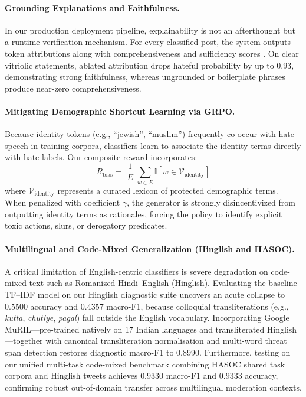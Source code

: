 \documentclass[11pt]{article}
\begin{document}
\paragraph{Grounding Explanations and Faithfulness.} 
In our production deployment pipeline, explainability is not an afterthought but a runtime verification mechanism. For every classified post, the system outputs token attributions along with comprehensiveness and sufficiency scores \citep{deyoung2020eraser}. On clear vitriolic statements, ablated attribution drops hateful probability by up to $0.93$, demonstrating strong faithfulness, whereas ungrounded or boilerplate phrases produce near-zero comprehensiveness.

\paragraph{Mitigating Demographic Shortcut Learning via GRPO.}
Because identity tokens (e.g., ``jewish'', ``muslim'') frequently co-occur with hate speech in training corpora, classifiers learn to associate the identity terms directly with hate labels. Our composite reward incorporates:
\begin{equation}
R_{\text{bias}} = \frac{1}{|E|} \sum_{w \in E} \mathbb{I}[w \in \mathcal{V}_{\text{identity}}]
\end{equation}
where $\mathcal{V}_{\text{identity}}$ represents a curated lexicon of protected demographic terms. When penalized with coefficient $\gamma$, the generator is strongly disincentivized from outputting identity terms as rationales, forcing the policy to identify explicit toxic actions, slurs, or derogatory predicates.

\paragraph{Multilingual and Code-Mixed Generalization (Hinglish and HASOC).}
A critical limitation of English-centric classifiers is severe degradation on code-mixed text such as Romanized Hindi--English (Hinglish). Evaluating the baseline TF--IDF model on our Hinglish diagnostic suite uncovers an acute collapse to $0.5500$ accuracy and $0.4357$ macro-F1, because colloquial transliterations (e.g., \emph{kutta}, \emph{chutiye}, \emph{pagal}) fall outside the English vocabulary. Incorporating Google MuRIL---pre-trained natively on 17 Indian languages and transliterated Hinglish---together with canonical transliteration normalisation and multi-word threat span detection restores diagnostic macro-F1 to $0.8990$. Furthermore, testing on our unified multi-task code-mixed benchmark combining HASOC shared task corpora and Hinglish tweets achieves $0.9330$ macro-F1 and $0.9333$ accuracy, confirming robust out-of-domain transfer across multilingual moderation contexts.
\end{document}
